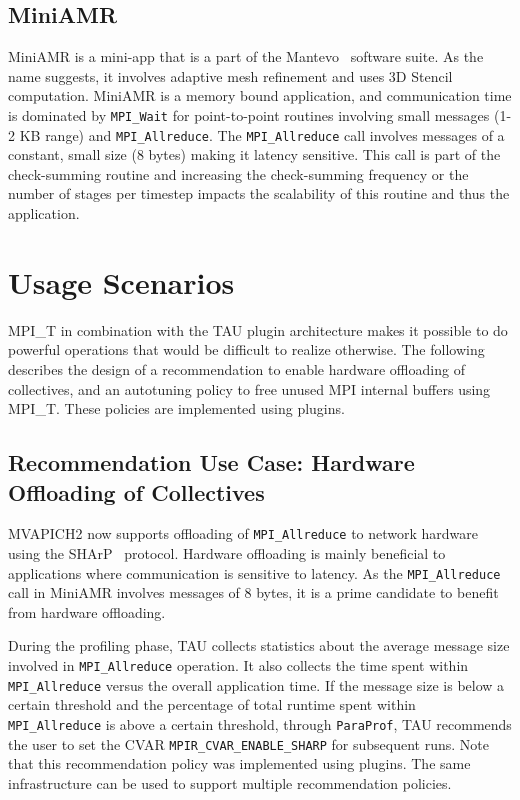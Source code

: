  \subsection{MiniAMR}

  MiniAMR is a mini-app that is a part of the Mantevo~\cite{Mantevo} software suite. As the name suggests, it involves adaptive mesh refinement and uses 3D Stencil computation. MiniAMR is a memory bound application, and communication time is dominated by \verb+MPI_Wait+ for point-to-point routines involving small messages (1-2 KB range) and \verb+MPI_Allreduce+. The \verb+MPI_Allreduce+ call involves messages of a constant, small size (8 bytes) making it latency sensitive. This call is part of the check-summing routine and increasing the check-summing frequency or the number of stages per timestep impacts the scalability of this routine and thus the application.

\section{Usage Scenarios}
MPI\_T in combination with the TAU plugin architecture makes it possible to do powerful operations that would be difficult to realize otherwise. The following describes the design of a recommendation to enable hardware offloading of collectives, and an autotuning policy to free unused MPI internal buffers using MPI\_T. These policies are implemented using plugins.
\subsection{Recommendation Use Case: Hardware Offloading of Collectives}
MVAPICH2 now supports offloading of \verb+MPI_Allreduce+ to network hardware using the SHArP~\cite{SHARP} protocol. Hardware offloading is mainly beneficial to applications where communication is sensitive to latency. As the \verb+MPI_Allreduce+ call in MiniAMR involves messages of 8 bytes, it is a prime candidate to benefit from hardware offloading. \par
During the profiling phase, TAU collects statistics about the average message size involved in \verb+MPI_Allreduce+ operation. It also collects the time spent within \verb+MPI_Allreduce+ versus the overall application time. If the message size is below a certain threshold and the percentage of total runtime spent within \verb+MPI_Allreduce+ is above a certain threshold, through \verb+ParaProf+, TAU recommends the user to set the CVAR \verb+MPIR_CVAR_ENABLE_SHARP+ for subsequent runs. Note that this recommendation policy was implemented using plugins. The same infrastructure can be used to support multiple recommendation policies.
